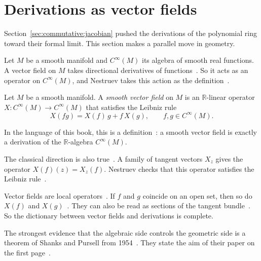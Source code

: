 \section{Derivations as vector fields}\label{sec:commutative:vector-fields-geometry}

Section~\ref{sec:commutative:jacobian} pushed the derivations of the
polynomial ring toward their formal limit. This section makes a parallel move
in geometry.

Let $M$ be a smooth manifold and $C^\infty(M)$ its algebra of smooth real
functions. A vector field on $M$ takes directional derivatives of
functions~\cite[p.~122]{Nestruev2020}. So it acts as an operator on
$C^\infty(M)$, and Nestruev takes this action as the
definition~\cite[p.~122]{Nestruev2020}.

\begin{definition}\label{def:comm:vf}
Let $M$ be a smooth manifold. A \emph{smooth vector field} on $M$ is an
$\mathbb{R}$-linear operator $X\colon C^\infty(M) \to C^\infty(M)$ that
satisfies the Leibniz rule
\[
X(fg) = X(f)\,g + f\,X(g), \qquad f, g \in C^\infty(M).
\]
\end{definition}

In the language of this book, this is a
definition~\cite[p.~122]{Nestruev2020}: a smooth vector field is exactly a
derivation of the $\mathbb{R}$-algebra $C^\infty(M)$.

The classical direction is also true~\cite[p.~122]{Nestruev2020}. A family of
tangent vectors $X_z$ gives the operator $X(f)(z) = X_z(f)$. Nestruev checks
that this operator satisfies the Leibniz rule~\cite[p.~122]{Nestruev2020}.

Vector fields are local operators~\cite[Section~9.40, p.~123]{Nestruev2020}.
If $f$ and $g$ coincide on an open set, then so do $X(f)$ and
$X(g)$~\cite[Section~9.40, p.~123]{Nestruev2020}. They can also be read as
sections of the tangent bundle~\cite[p.~123]{Nestruev2020}. So the dictionary
between vector fields and derivations is complete.

The strongest evidence that the algebraic side controls the geometric side is
a theorem of Shanks and Pursell from
1954~\cite[p.~468]{ShanksPursell1954}. They state the aim of their paper on the
first page~\cite[p.~468]{ShanksPursell1954}.

